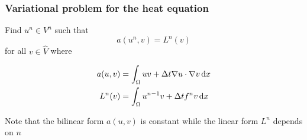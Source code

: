 \begin{frame}
  \frametitle{Variational problem for the heat equation}

  Find $u^n \in V^n$ such that
  \begin{equation*}
    a(u^n, v) = L^n(v)
  \end{equation*}
  for all $v \in \hat{V}$ where

  \bigskip

  \begin{align*}
    a(u, v) &= \int_\Omega uv + {\Delta t} \nabla u\cdot \nabla v \, \mathrm{d}x
    \\
    L^n(v) &= \int_\Omega u^{n-1} v + {\Delta t} f^n v \, \mathrm{d}x
  \end{align*}

  Note that the bilinear form $a(u, v)$ is constant while the linear
  form $L^n$ depends on $n$

\end{frame}
